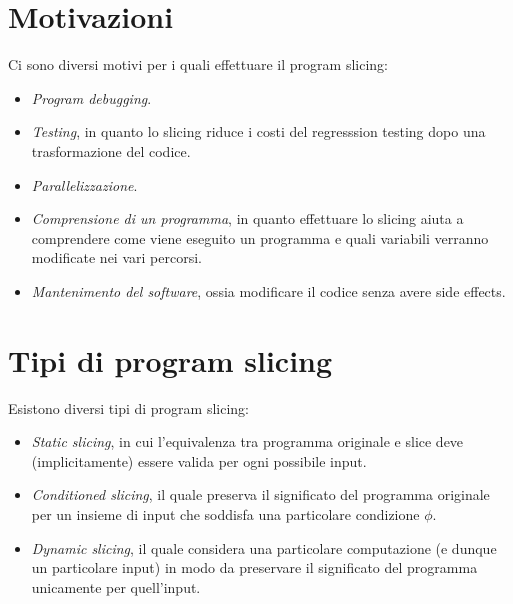 \documentclass[a4paper,oneside,titlepage]{book}
\begin{document}
\section{Motivazioni}
Ci sono diversi motivi per i quali effettuare il program slicing:
\begin{itemize}
    \item \textit{Program debugging}.
    \item \textit{Testing}, in quanto lo slicing riduce i costi del regresssion testing dopo una trasformazione del codice.
    \item \textit{Parallelizzazione}.
    \item \textit{Comprensione di un programma}, in quanto effettuare lo slicing aiuta a comprendere come viene eseguito un programma e quali variabili verranno modificate nei vari percorsi.
    \item \textit{Mantenimento del software}, ossia modificare il codice senza avere side effects.
\end{itemize}

\section{Tipi di program slicing}
Esistono diversi tipi di program slicing:
\begin{itemize}
	\item \textit{Static slicing}, in cui l'equivalenza tra programma originale e slice deve (implicitamente) essere valida per ogni possibile input.
	\item \textit{Conditioned slicing}, il quale preserva il significato del programma originale per un insieme di input che soddisfa una particolare condizione $\phi$.
	\item \textit{Dynamic slicing}, il quale considera una particolare computazione (e dunque un particolare input) in modo da preservare il significato del programma unicamente per quell'input.
\end{itemize}
\end{document}
